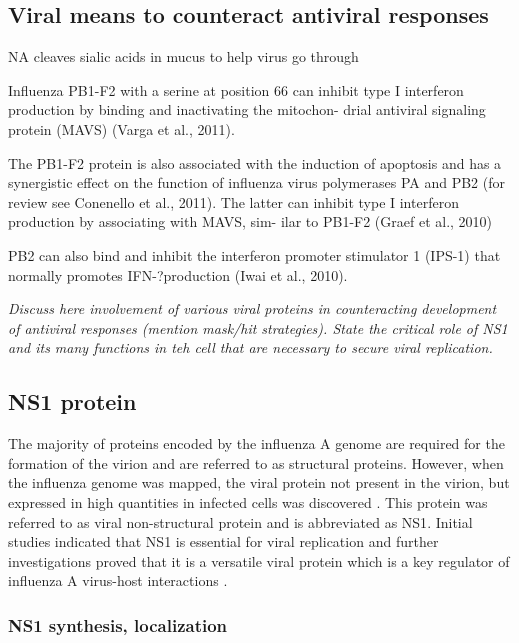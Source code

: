 	\subsection{Viral means to counteract antiviral responses}
	
	NA cleaves sialic acids in mucus to help virus go through
	
	Influenza PB1-F2 with a serine at position 66 can inhibit type
	I interferon production by binding and inactivating the mitochon- drial antiviral signaling protein (MAVS) (Varga et al., 2011).
	
	The PB1-F2 protein is also associated with the induction of apoptosis and has a synergistic effect on the function of influenza virus polymerases PA and PB2 (for review see Conenello et al., 2011). The latter can inhibit type I interferon production by associating with MAVS, sim- ilar to PB1-F2 (Graef et al., 2010)
	
	PB2 can also bind and inhibit the interferon promoter stimulator 1 (IPS-1) that normally promotes IFN-?production (Iwai et al., 2010).
	
	
		\textit{Discuss here involvement of various viral proteins in counteracting development of antiviral responses (mention mask/hit strategies). State the critical role of NS1 and its many functions in teh cell that are necessary to secure viral replication.}
			
	\subsection{NS1 protein}
		
		The majority of proteins encoded by the influenza A genome are required for the formation of the virion and are referred to as structural proteins. However, when the influenza genome was mapped, the viral protein not present in the virion, but expressed in high quantities in infected cells was discovered \parencite{Ritchey1976}. This protein was referred to as viral non-structural protein and is abbreviated as \gls{NS1}. Initial studies indicated that \gls{NS1} is essential for viral replication \parencite{Koennecke1981} and further investigations proved that it is a versatile viral protein which is a key regulator of influenza A virus-host interactions \parencite{Ayllon2015}.
		
		\subsubsection{NS1 synthesis, localization}
		

